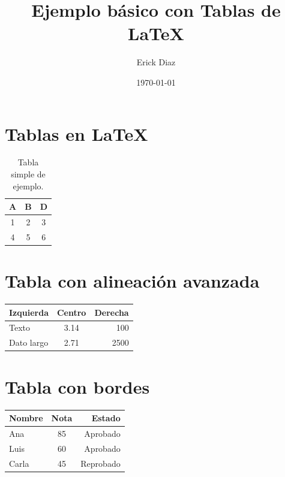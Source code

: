 \documentclass{article}
\title{Ejemplo básico con Tablas de LaTeX}
\author{Erick Diaz}
\date{\today}
\begin{document}
\maketitle

\section{Tablas en LaTeX}

\begin{table}[h]
    \centering
    \begin{tabular}{c c c}
    \hline
    A & B & D \\
    \hline
    1 & 2 & 3 \\
    4 & 5 & 6 \\
    \hline
    \end{tabular}
    \caption{Tabla simple de ejemplo.}
\end{table}


\section{Tabla con alineación avanzada}
\begin{tabular}{l c r}
\hline
Izquierda & Centro & Derecha \\
\hline
Texto & 3.14 & 100 \\
Dato largo & 2.71 & 2500 \\
\hline
\end{tabular}

\section{Tabla con bordes}
\begin{tabular}{|l|c|r|}
\hline
Nombre & Nota & Estado \\
\hline
Ana & 85 & Aprobado \\
Luis & 60 & Aprobado \\
Carla & 45 & Reprobado \\
\hline
\end{tabular}
\end{document}
